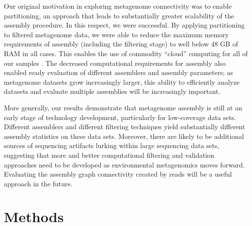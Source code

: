 \documentclass[10pt]{article}
\begin{document}
Our original motivation in exploring metagenome connectivity was to
enable partitioning, an approach that leads to substantially greater
scalability of the assembly procedure.  In this respect, we were successful.
By applying partitioning to filtered metagenome data, we were able to
reduce the maximum memory requirements of assembly (including the
filtering stage) to well below 48 GB of RAM in all cases.  This
enables the use of commodity ``cloud'' computing for all of our
samples \cite{Angiuoli:2011hd}.  The decreased computational
requirements for assembly also enabled ready evaluation of different
assemblers and assembly parameters; as metagenome datasets grow
increasingly larger, this ability to efficiently analyze datasets and
evaluate multiple assemblies will be increasingly important.

More generally, our results demonstrate that metagenome assembly is
still at an early stage of technology development, particularly for
low-coverage data sets.  Different assemblers and different filtering
techniques yield substantially different assembly statistics on these
data sets.  Moreover, there are likely to be additional sources of
sequencing artifacts lurking within large sequencing data sets,
suggesting that more and better computational filtering and validation
approaches need to be developed as environmental metagenomics moves
forward.  Evaluating the assembly graph connectivity created by reads
will be a useful approach in the future.

\section*{Methods}
\end{document}

